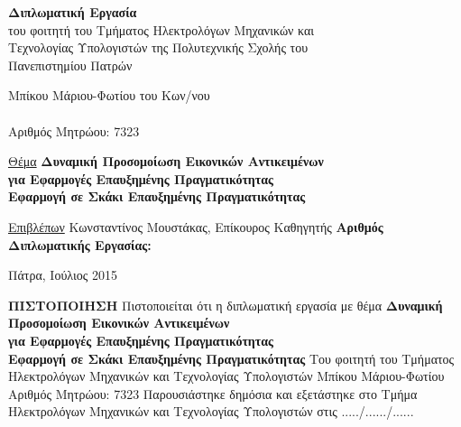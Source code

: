 \begin{center}
\LARGE\textbf{Διπλωματική Εργασία}\\
\Large
του φοιτητή του Τμήματος Ηλεκτρολόγων Μηχανικών και\\
Τεχνολογίας Υπολογιστών της Πολυτεχνικής Σχολής του\\
Πανεπιστημίου Πατρών
\end{center}
\vskip0.5cm
\begin{center}
\LARGE
Μπίκου Μάριου-Φωτίου του Κων/νου\\
~~\\
Αριθμός Μητρώου: 7323
\end{center}

\vskip1cm
\begin{center}
\LARGE
\underline{Θέμα}
\vskip0.3cm
\textbf{Δυναμική Προσομοίωση Εικονικών Αντικειμένων \\ για Εφαρμογές Επαυξημένης Πραγματικότητας}
\\
\Large 
\textbf{Εφαρμογή σε Σκάκι Επαυξημένης Πραγματικότητας}

\end{center}

\vskip1cm
\begin{center}
\Large
\underline{Επιβλέπων}
\vskip0.2cm
Κωνσταντίνος Μουστάκας, Επίκουρος Καθηγητής
\vskip1cm
\textbf{Αριθμός Διπλωματικής Εργασίας:}
\end{center}
\vfill
\centerline{
\Large Πάτρα, Ιούλιος 2015
}
\clearpage
\null\clearpage %



\begin{center}
\LARGE
\textbf{ΠΙΣΤΟΠΟΙΗΣΗ}
\vskip0.5cm
Πιστοποιείται ότι η διπλωματική εργασία με θέμα
\vskip0.5cm
\textbf{Δυναμική Προσομοίωση Εικονικών Αντικειμένων \\ για Εφαρμογές Επαυξημένης Πραγματικότητας}
\\
\Large 
\textbf{Εφαρμογή σε Σκάκι Επαυξημένης Πραγματικότητας
}
\vskip2cm
\Large
Του φοιτητή του Τμήματος Ηλεκτρολόγων Μηχανικών και Τεχνολογίας Υπολογιστών
\vskip1cm
Μπίκου Μάριου-Φωτίου\\
\vskip0.5cm
Αριθμός Μητρώου: 7323
\vskip2cm
Παρουσιάστηκε δημόσια και εξετάστηκε στο Τμήμα Ηλεκτρολόγων Μηχανικών και Τεχνολογίας Υπολογιστών στις ...../....../......
\end{center}

\vfill

